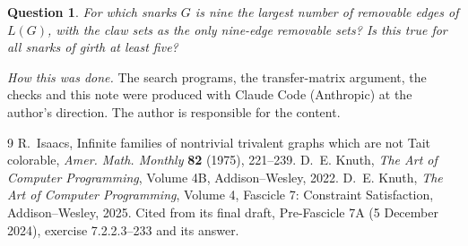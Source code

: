 \documentclass[11pt]{amsart}
\newtheorem{question}[theorem]{Question}
\theoremstyle{remark}
\begin{document}
\begin{question}
For which snarks $G$ is nine the largest number of removable edges of $L(G)$, with the claw sets as the only
nine-edge removable sets? Is this true for all snarks of girth at least five?
\end{question}

\medskip\noindent\emph{How this was done.} The search programs, the transfer-matrix argument, the checks and this
note were produced with Claude Code (Anthropic) at the author's direction. The author is responsible for the
content.

\begin{thebibliography}{9}
 R.~Isaacs, Infinite families of nontrivial trivalent graphs which are not Tait colorable,
\emph{Amer. Math. Monthly} \textbf{82} (1975), 221--239.
 D.~E. Knuth, \emph{The Art of Computer Programming}, Volume 4B, Addison--Wesley, 2022.
 D.~E. Knuth, \emph{The Art of Computer Programming}, Volume 4, Fascicle 7: Constraint
Satisfaction, Addison--Wesley, 2025. Cited from its final draft, Pre-Fascicle 7A (5 December 2024), exercise
7.2.2.3--233 and its answer.
\end{thebibliography}
\end{document}
